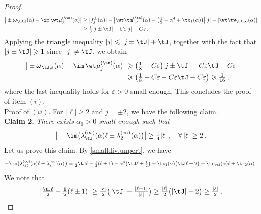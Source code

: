 \documentclass[a4paper,reqno,10pt]{article}
\newcommand{\bomega}{{\boldsymbol{\omega}}}
\begin{document}
\begin{proof}
\begin{align}
  	 \big| \pm \bomega_{\tJ,\varepsilon}(\alpha)  -\im\,\wt\mu_{j}^{(\tn)}(\alpha) \big| &  \geq \big|f_j^{\pm}(\alpha) \big| - \big| \wt\tm_{1,\varepsilon}^{(\tn)}(\alpha) - \big( \tfrac12 -\alpha^4 + \tc_{1}(\alpha) \big)  \big| |j| - |\wt\tw_{\tJ,\infty}(\alpha)| \\
  	 & \geq \tfrac18|j\pm \tJ| - C\varepsilon |j| -C\varepsilon \,.
  \end{align}
  Applying the triangle inequality $|j| \leqslant |j \pm \tJ| + \tJ$, together with the fact that $|j \pm \tJ| \geqslant 1$ since $|j|\neq \tJ$, we obtain
  \begin{align}
  	 \big| \pm \bomega_{\tJ,\varepsilon}(\alpha)  -\im\,\wt\mu_{j}^{(\tn)}(\alpha) \big| 
  	 & \geqslant \big(\tfrac18-C \varepsilon\big)|j\pm \tJ| -C\varepsilon \tJ-C\varepsilon\\
     &\geqslant  \big(\tfrac18-C \varepsilon-C\varepsilon \tJ-C\varepsilon\big)\geqslant  \tfrac{1}{16}\,,
  \end{align}
  where the last inequality holds for $\varepsilon>0$ small enough. This concludes the proof of item $(i)$.
  \\[1mm]
   {\sc Proof of $(ii)$}. For $|\ell |\geq 2$ and $j=\pm 2$, we have the following claim.
  \\[1mm]
  {\bf Claim 2.} {\it There exists $\alpha_{0}>0$ small enough such that}
  \begin{equation}\label{claim-2}
  	\big|  	-\im\big(  \lambda_{\tJ}^{(\infty)}(\alpha) \ell  \pm \lambda_{2}^{(\infty)} (\alpha) \big)   \big| \geq \tfrac14 |\ell|\,, \quad \forall \,|\ell| \geq 2 \,.
  \end{equation}
Let us prove this claim. 
  By \eqref{smalldiv.unpert}, we have
  	\begin{equation}
  		-\im\big(  \lambda_{\tJ}^{(\infty)}(\alpha) \ell  \pm \lambda_{2}^{(\infty)} (\alpha) \big)  
  		 = \tfrac12 \tJ \ell - \tfrac12 (\ell\pm 1) - \alpha^4 \big( \tJ \ell \pm\tfrac12 \big) + \tc_{1}(\alpha) \big( \tJ \ell \pm 2 \big) + \tr_{\tJ}(\alpha)\ell \pm \tr_{2}(\alpha) \,.
  	\end{equation}
  	We note that
  	\begin{align}
  		\big|  \tfrac{\tJ \ell}{2} - \tfrac12 (\ell\pm 1)\big| \geq \tfrac{|\ell|}{2}  \big( |\tJ|- \tfrac{|\ell \pm 1|}{|\ell|} \big) \geq \tfrac{|\ell|}{2}   \big( |\tJ| - 2 \big) \geq \tfrac{|\ell|}{2}  \,,

\end{align}
\end{proof}
\end{document}
